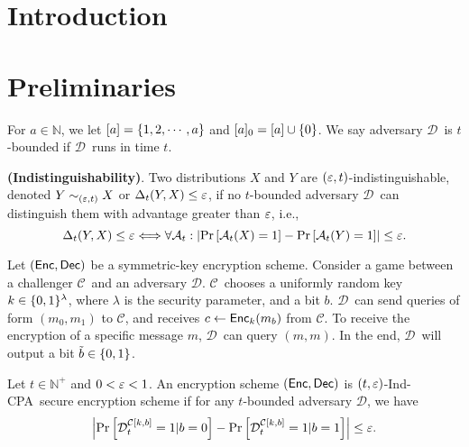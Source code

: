 \documentclass{article}
\newcommand{\tcpa}{$(t,\eps)$-Ind-CPA}
\def\a {${\mathcal D}$}
\def\ch {${\mathcal C}$}
\newcommand{\NN}{{\mathbb{N}}}
\begin{document}
\title{}
\author{}

\maketitle

\def \cF {\F}

\begin{abstract}
\end{abstract}

\section{Introduction}
\section{Preliminaries}

For $a\in \NN$, we let $[a]=\left\{ 1,2, \cdots, a \right\}$ and $[a]_0=[a]\cup \left\{ 0 \right\}$. We say adversary \a~is $t$-bounded if \a~runs in time $t$.%

\begin{definition}\textbf{(Indistinguishability)}. Two distributions $X$ and $Y$ are $(\varepsilon,t)$-indistinguishable, denoted $Y \sim_{(\varepsilon,t)} X$ or $\Delta_{t}(Y,X)\leq \varepsilon$, if  no $t$-bounded adversary \a~can distinguish them with advantage greater than $\varepsilon$, i.e., \[ \Delta_{t}(Y,X)\leq \varepsilon \Longleftrightarrow \forall \mathcal{A}_t : \left| \Pr \left[ \mathcal{A}_t(X)=1 \right]-\Pr \left[ \mathcal{A}_t(Y)=1 \right]  \right|\leq \varepsilon. \]
\end{definition}

Let $({\sf Enc},{\sf Dec})$ be a symmetric-key encryption scheme. Consider a game between a challenger \ch~and an adversary \a. \ch~chooses a uniformly random key $k\in \{0,1\}^\lambda$, where $\lambda$ is the security parameter, and a bit $b$. \a~can send queries of form $(m_0,m_1)$ to \ch, and receives $c\leftarrow {\sf Enc}_k(m_b)$ from \ch. To receive the encryption of a specific message $m$, \a~can query $(m,m)$. In the end, \a~will output a bit $\tilde{b}\in \{0,1\}$. 

\begin{definition} Let $t \in \NN^+$ and $0<\varepsilon <1$. An encryption scheme $({\sf Enc},{\sf Dec})$ is \tcpa~secure encryption scheme if for any $t$-bounded adversary \a, we have $$\left| \Pr \left[ \mathcal{D}_t^{\mathcal{C}[k,b]}=1|b=0 \right] - \Pr \left[ \mathcal{D}_t^{\mathcal{C}[k,b]}=1|b=1 \right]  \right|\leq \varepsilon.$$
\end{definition}
\end{document}
